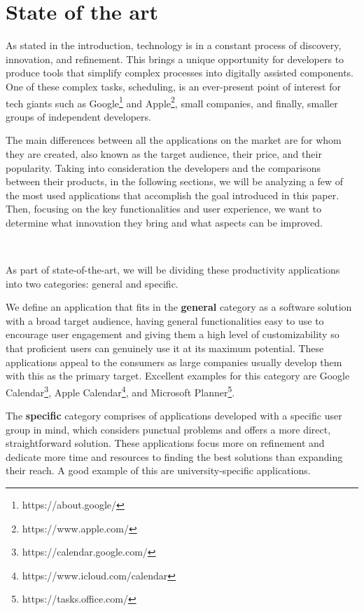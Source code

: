 \chapter{State of the art} \label{chapter3}

As stated in the introduction, technology is in a constant process of discovery, innovation, and refinement. This brings a unique opportunity for developers to produce tools that simplify complex processes into digitally assisted components.
	One of these complex tasks, scheduling, is an ever-present point of interest for tech giants such as Google\footnote{https://about.google/} and Apple\footnote{https://www.apple.com/}, small companies, and finally, smaller groups of independent developers.

The main differences between all the applications on the market are for whom they are created, also known as the target audience, their price, and their popularity.
	Taking into consideration the developers and the comparisons between their products, in the following sections, we will be analyzing a few of the most used applications that accomplish the goal introduced in this paper. Then, focusing on the key functionalities and user experience, we want to determine what innovation they bring and what aspects can be improved.

~

	As part of state-of-the-art, we will be dividing these productivity applications into two categories: general and specific. 
	
	We define an application that fits in the \textbf{general} category as a software solution with a broad target audience, having general functionalities easy to use to encourage user engagement and giving them a high level of customizability so that proficient users can genuinely use it at its maximum potential. These applications appeal to the consumers as large companies usually develop them with this as the primary target. Excellent examples for this category are Google Calendar\footnote{https://calendar.google.com/}, Apple Calendar\footnote{https://www.icloud.com/calendar}, and Microsoft Planner\footnote{https://tasks.office.com/}. 

	The \textbf{specific} category comprises of applications developed with a specific user group in mind, which considers punctual problems and offers a more direct, straightforward solution. These applications focus more on refinement and dedicate more time and resources to finding the best solutions than expanding their reach. 
A good example of this are university-specific applications. 

